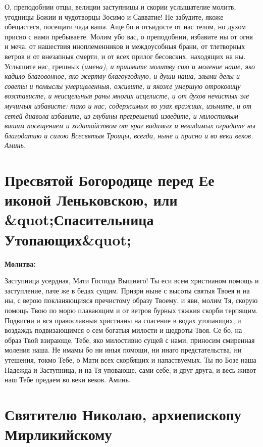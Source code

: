 О, преподобнии отцы, велиции заступницы и скории услышателие молитв, угодницы Божии и чудотворцы Зосимо и Савватие! Не забудите, якоже обещастеся, посещати чада ваша. Аще бо и отъидосте от нас телом, но духом присно с нами пребываете. Молим убо вас, о преподобнии, избавите ны от огня и меча, от нашествия иноплеменников и междоусобныя брани, от тлетворных ветров и от внезапныя смерти, и от всех прилог бесовских, находящих на ны. Услышите нас, грешных (\itshape имена\normalfont{}), и приимите молитву сию и моление наше, яко кадило благовонное, яко жертву благоугодную, и души наша, злыми делы и советы и помыслы умерщвленныя, оживите, и якоже умершую отроковицу возстависте, и неисцельныя раны многих исцелисте, и от духов нечистых зле мучимыя избависте: тако и нас, содержимых во узах вражиих, изьмите, и от сетей диавола избавите, из глубины прегрешений изведите, и милостивым вашим посещением и ходатайством от враг видимых и невидимых оградите ны благодатию и силою Всесвятыя Троицы, всегда, ныне и присно и во веки веков. Аминь.


\section{Пресвятой Богородице перед Ее иконой Леньковскою, или &quot;Спасительница Утопающих&quot;}
 


\bfseries Молитва:\normalfont{}


Заступница усердная, Мати Господа Вышняго! Ты еси всем xристианом помощь и заступление, паче же в бедах сущим. Призри ныне с высоты святыя Твоея и на ны, с верою покланяющияся пречистому образу Твоему, и яви, молим Тя, скорую помощь Твою по морю плавающим и от ветров бурных тяжкия скорби терпящим. Подвигни и вся православныя христианы на спасение в водах утопающих, и воздаждь подвизающимся о сем богатыя милости и щедроты Твоя. Се бо, на образ Твой взирающе, Тебе, яко милостивно сущей с нами, приносим смиренная моления наша. Не имамы бо ни иныя помощи, ни инаго предстательства, ни утешения, токмо Тебе, о Мати всех скорбящих и напаствуемых. Ты по Бозе наша Надежда и Заступница, и на Тя уповающе, сами себе, и друг друга, и весь живот наш Тебе предаем во веки веков. Аминь.


\section{Святителю Николаю, архиепископу Мирликийскому}
 


